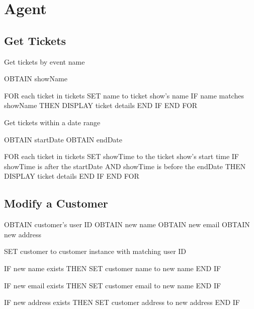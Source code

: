 \section{Agent}

\subsection{Get Tickets}
Get tickets by event name
\begin{pc}
OBTAIN showName

FOR each ticket in tickets
    SET name to ticket show's name
    IF name matches showName THEN
        DISPLAY ticket details
    END IF
END FOR
\end{pc}

Get tickets within a date range
\begin{pc}
OBTAIN startDate
OBTAIN endDate

FOR each ticket in tickets
    SET showTime to the ticket show's start time
    IF showTime is after the startDate AND showTime is before the endDate THEN
        DISPLAY ticket details
    END IF
END FOR
\end{pc}

\subsection{Modify a Customer}
\begin{pc}
OBTAIN customer's user ID
OBTAIN new name
OBTAIN new email
OBTAIN new address

SET customer to customer instance with matching user ID

IF new name exists THEN
    SET customer name to new name
END IF

IF new email exists THEN
    SET customer email to new name
END IF

IF new address exists THEN
    SET customer address to new address
END IF
\end{pc}
